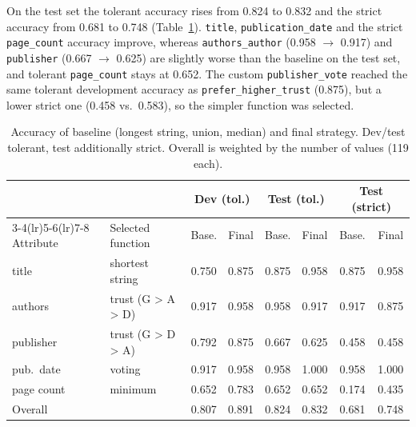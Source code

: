 \documentclass[a4paper,11pt]{article}
\begin{document}
On the test set the tolerant accuracy rises from 0.824 to 0.832 and the strict
accuracy from 0.681 to 0.748 (Table~\ref{tab:final}). \texttt{title},
\texttt{publication\_date} and the strict \texttt{page\_count} accuracy improve,
whereas \texttt{authors\_author} (0.958 $\to$ 0.917) and \texttt{publisher}
(0.667 $\to$ 0.625) are slightly worse than the baseline on the test set, and
tolerant \texttt{page\_count} stays at 0.652. The custom \texttt{publisher\_vote}
reached the same tolerant development accuracy as \texttt{prefer\_higher\_trust}
(0.875), but a lower strict one (0.458 vs.\ 0.583), so the simpler function was
selected.

\begin{table}[t]
\centering
\caption{Accuracy of baseline (longest string, union, median) and final strategy.
Dev/test tolerant, test additionally strict. Overall is weighted by the number
of values (119 each).}
\label{tab:final}
\small
\begin{tabular}{llcccccc}
\toprule
 & & \multicolumn{2}{c}{Dev (tol.)} & \multicolumn{2}{c}{Test (tol.)} & \multicolumn{2}{c}{Test (strict)} \\
\cmidrule(lr){3-4}\cmidrule(lr){5-6}\cmidrule(lr){7-8}
Attribute & Selected function & Base. & Final & Base. & Final & Base. & Final \\
\midrule
title       & shortest string    & 0.750 & 0.875 & 0.875 & 0.958 & 0.875 & 0.958 \\
authors     & trust (G > A > D)  & 0.917 & 0.958 & 0.958 & 0.917 & 0.917 & 0.875 \\
publisher   & trust (G > D > A)  & 0.792 & 0.875 & 0.667 & 0.625 & 0.458 & 0.458 \\
pub.\ date  & voting             & 0.917 & 0.958 & 0.958 & 1.000 & 0.958 & 1.000 \\
page count  & minimum            & 0.652 & 0.783 & 0.652 & 0.652 & 0.174 & 0.435 \\
\midrule
Overall     &                    & 0.807 & 0.891 & 0.824 & 0.832 & 0.681 & 0.748 \\
\bottomrule
\end{tabular}
\end{table}
\end{document}
